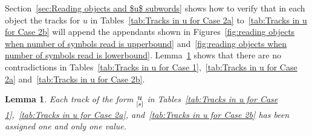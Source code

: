 \documentclass[11pt]{article} \usepackage{amsfonts,amsmath,amssymb,amsthm}
\newtheorem{lemma}{Lemma}
\newcommand{\track}[2]{\raisebox{2.5pt}{\ensuremath{\underset{[#1]}#2}}}
\begin{document}
Section~\ref{sec:Reading objects and $u$ subwords} shows how to verify that in each object the tracks for $u$ in Tables~\ref{tab:Tracks in u for Case 2a} to~\ref{tab:Tracks in u for Case 2b} will append the appendants shown in Figures~\ref{fig:reading objects when number of symbols read is upperbound} and~\ref{fig:reading objects when number of symbols read is lowerbound}.
Lemma~\ref{lem:Correctness of u} shows that there are no contradictions in Tables~\ref{tab:Tracks in u for Case 1},~\ref{tab:Tracks in u for Case 2a} and~\ref{tab:Tracks in u for Case 2b}.
\begin{lemma}\label{lem:Correctness of u}
Each track of the form $\track{s}{u}$ in Tables~\ref{tab:Tracks in u for Case 1},~\ref{tab:Tracks in u for Case 2a}, and~\ref{tab:Tracks in u for Case 2b} has been assigned one and only one value.  
\end{lemma}
\end{document}

